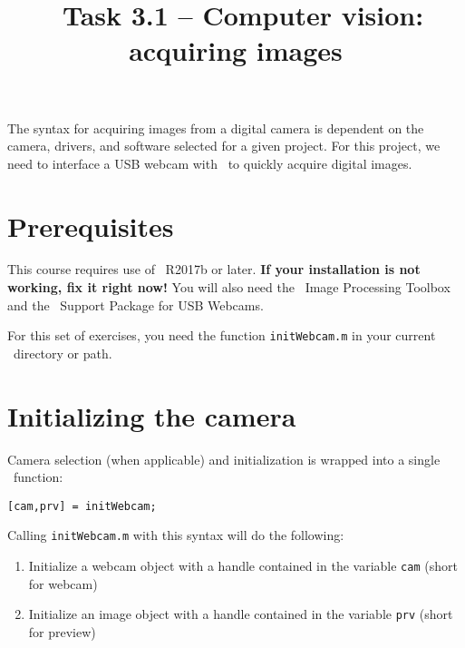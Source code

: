 \documentclass{tufte-handout}
\title{\usnaCourseNumber\ Task 3.1 -- Computer vision: acquiring images}
\author{\usnaInstructorShort}
\date{\printdate{\courseWeekTwo}}
\begin{document}
\maketitle

The syntax for acquiring images from a digital camera is dependent on the camera, drivers, and software selected for a given project. For this project, we need to interface a USB webcam with \Matlab\ to quickly acquire digital images.

\section{Prerequisites} 
This course requires use of \Matlab\ R2017b or later. \textbf{If your installation is not working, fix it right now!} You will also need the \Matlab\ Image Processing Toolbox and the \Matlab\ Support Package for USB Webcams. 
 
For this set of exercises, you need the function \lstinline{initWebcam.m} in your current \Matlab\ directory or path.
        
        
\section{Initializing the camera}
Camera selection (when applicable) and initialization is wrapped into a single \Matlab\ function:
\begin{lstlisting}[style=usnaMatlab]
[cam,prv] = initWebcam; 
\end{lstlisting}
Calling \lstinline{initWebcam.m} with this syntax will do the following:
\begin{enumerate}
\item Initialize a webcam object with a handle contained in the variable \lstinline{cam} (short for webcam)
\item Initialize an image object with a handle contained in the variable \lstinline{prv} (short for preview)
\end{enumerate}
\end{document}

